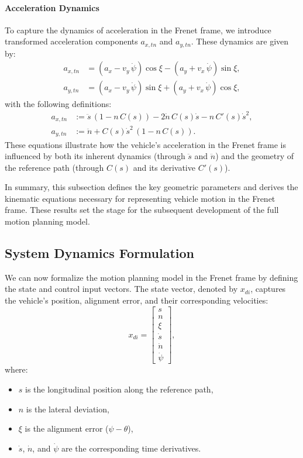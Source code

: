 \paragraph{Acceleration Dynamics}\label{par:acceleration_dynamics}
To capture the dynamics of acceleration in the Frenet frame, we introduce transformed acceleration components \(a_{x,tn}\) and \(a_{y,tn}\).
These dynamics are given by:
\begin{align}
	a_{x,tn} & = (a_x - v_y\,\dot{\psi})\cos{\xi} - (a_y + v_x\,\dot{\psi})\sin{\xi}, \label{eq:second_derivative_long} \\
	a_{y,tn} & = (a_x - v_y\,\dot{\psi})\sin{\xi} + (a_y + v_x\,\dot{\psi})\cos{\xi}, \label{eq:second_derivative_lat}
\end{align}
with the following definitions:
\begin{align}
	a_{x,tn} & := \ddot{s}\,(1 - n\,C(s)) - 2\dot{n}\,C(s)\dot{s} - n\,C'(s)\dot{s}^2, \label{def:axtn} \\
	a_{y,tn} & := \ddot{n} + C(s)\dot{s}^2\,(1 - n\,C(s)). \label{def:aytn}
\end{align}
These equations illustrate how the vehicle's acceleration in the Frenet frame is influenced by both its inherent dynamics (through \(\ddot{s}\) and
\(\ddot{n}\)) and the geometry of the reference path (through \(C(s)\) and its derivative \(C'(s)\)).

In summary, this subsection defines the key geometric parameters and derives the kinematic equations necessary for representing vehicle motion in the
Frenet frame.
These results set the stage for the subsequent development of the full motion planning model.

\subsection{System Dynamics Formulation}

We can now formalize the motion planning model in the Frenet frame by defining the state and control input vectors.
The state vector, denoted by \(x_{di}\), captures the vehicle's position, alignment error, and their corresponding velocities:
\begin{equation}
	x_{di} = \begin{bmatrix}
		s       \\
		n       \\
		\xi     \\
		\dot{s} \\
		\dot{n} \\
		\dot{\psi}
	\end{bmatrix},
\end{equation}
where:
\begin{itemize}
	\item \(s\) is the longitudinal position along the reference path,
	\item \(n\) is the lateral deviation,
	\item \(\xi\) is the alignment error (\(\psi - \theta\)),
	\item \(\dot{s}\), \(\dot{n}\), and \(\dot{\psi}\) are the corresponding time derivatives.
\end{itemize}

